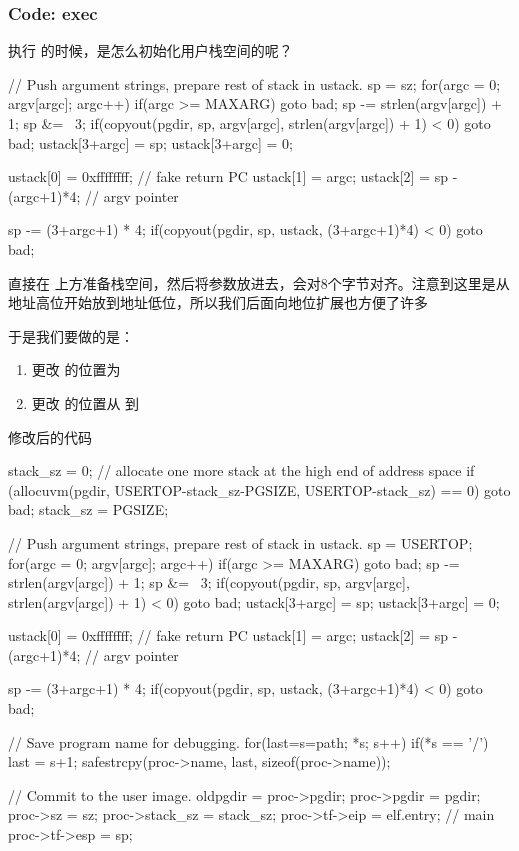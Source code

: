 \subsubsection{Code: exec}

执行  的时候，是怎么初始化用户栈空间的呢？

\begin{ccode}
    // Push argument strings, prepare rest of stack in ustack.
    sp = sz;
    for(argc = 0; argv[argc]; argc++) {
        if(argc >= MAXARG)
        goto bad;
        sp -= strlen(argv[argc]) + 1;
        sp &= ~3;
        if(copyout(pgdir, sp, argv[argc], strlen(argv[argc]) + 1) < 0)
        goto bad;
        ustack[3+argc] = sp;
    }
    ustack[3+argc] = 0;

    ustack[0] = 0xffffffff;  // fake return PC
    ustack[1] = argc;
    ustack[2] = sp - (argc+1)*4;  // argv pointer

    sp -= (3+argc+1) * 4;
    if(copyout(pgdir, sp, ustack, (3+argc+1)*4) < 0)
        goto bad;
\end{ccode}

直接在  上方准备栈空间，然后将参数放进去，会对8个字节对齐。注意到这里是从地址高位开始放到地址低位，所以我们后面向地位扩展也方便了许多

于是我们要做的是：

\begin{enumerate}
    \item 更改  的位置为 
    \item 更改  的位置从  到 
\end{enumerate}

修改后的代码

\begin{ccode}
    stack_sz = 0;
    // allocate one more stack at the high end of address space
    if (allocuvm(pgdir, USERTOP-stack_sz-PGSIZE, USERTOP-stack_sz) == 0)
        goto bad;
    stack_sz = PGSIZE;

    // Push argument strings, prepare rest of stack in ustack.
    sp = USERTOP;
    for(argc = 0; argv[argc]; argc++) {
        if(argc >= MAXARG)
        goto bad;
        sp -= strlen(argv[argc]) + 1;
        sp &= ~3;
        if(copyout(pgdir, sp, argv[argc], strlen(argv[argc]) + 1) < 0)
        goto bad;
        ustack[3+argc] = sp;
    }
    ustack[3+argc] = 0;

    ustack[0] = 0xffffffff;  // fake return PC
    ustack[1] = argc;
    ustack[2] = sp - (argc+1)*4;  // argv pointer

    sp -= (3+argc+1) * 4;
    if(copyout(pgdir, sp, ustack, (3+argc+1)*4) < 0)
        goto bad;

    // Save program name for debugging.
    for(last=s=path; *s; s++)
        if(*s == '/')
        last = s+1;
    safestrcpy(proc->name, last, sizeof(proc->name));

    // Commit to the user image.
    oldpgdir = proc->pgdir;
    proc->pgdir = pgdir;
    proc->sz = sz;
    proc->stack_sz = stack_sz;
    proc->tf->eip = elf.entry;  // main
    proc->tf->esp = sp;
\end{ccode}

